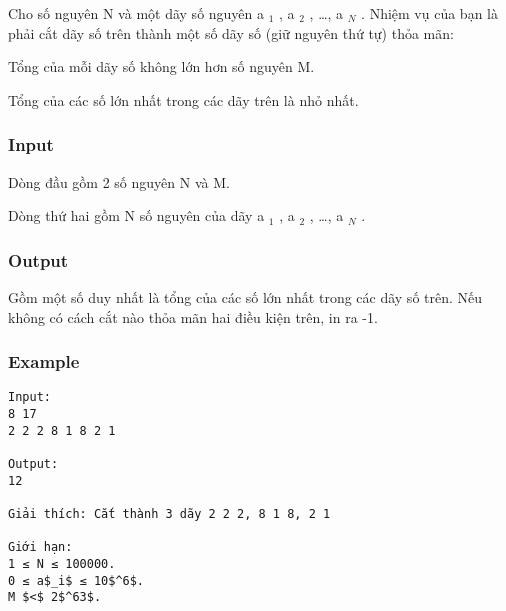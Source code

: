 



   Cho số nguyên N và một dãy số nguyên a   $_    1   $   , a   $_    2   $   , …, a   $_    N   $   . Nhiệm vụ của bạn là phải cắt dãy số trên thành một số dãy số (giữ nguyên thứ tự) thỏa mãn:  

   Tổng của mỗi dãy số không lớn hơn số nguyên M.  

   Tổng của các số lớn nhất trong các dãy trên là nhỏ nhất.  

\subsubsection{   Input  }

   Dòng đầu gồm 2 số nguyên N và M.  

   Dòng thứ hai gồm N số nguyên của dãy a   $_    1   $   , a   $_    2   $   , …, a   $_    N   $   .  

\subsubsection{   Output  }

   Gồm một số duy nhất là tổng của các số lớn nhất trong các dãy số trên. Nếu không có cách cắt nào thỏa mãn hai điều kiện trên, in ra -1.  

\subsubsection{   Example  }
\begin{verbatim}
Input:
8 17
2 2 2 8 1 8 2 1

Output:
12

Giải thích: Cắt thành 3 dãy 2 2 2, 8 1 8, 2 1

Giới hạn:
1 ≤ N ≤ 100000.
0 ≤ a$_i$ ≤ 10$^6$.
M $<$ 2$^63$.

\end{verbatim}
